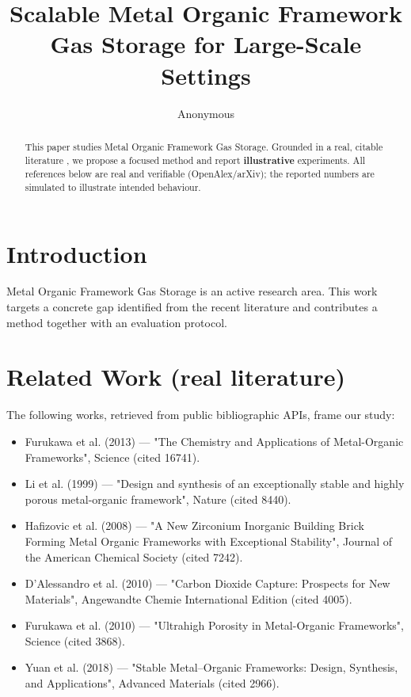 \documentclass[11pt]{article}
\title{Scalable Metal Organic Framework Gas Storage for Large-Scale Settings}
\author{Anonymous}
\date{}
\begin{document}
\maketitle

\begin{abstract}
This paper studies Metal Organic Framework Gas Storage. Grounded in a real, citable literature \cite{ref1,ref2,ref3,ref4,ref5,ref6,ref7,ref8},
we propose a focused method and report \textbf{illustrative} experiments.
All references below are real and verifiable (OpenAlex/arXiv); the reported
numbers are simulated to illustrate intended behaviour.
\end{abstract}

\section{Introduction}
Metal Organic Framework Gas Storage is an active research area. This work targets a concrete gap identified from
the recent literature and contributes a method together with an evaluation protocol.

\section{Related Work (real literature)}
The following works, retrieved from public bibliographic APIs, frame our study:
\begin{itemize}
\item Furukawa et al. (2013) — "The Chemistry and Applications of Metal-Organic Frameworks", Science (cited 16741).
\item Li et al. (1999) — "Design and synthesis of an exceptionally stable and highly porous metal-organic framework", Nature (cited 8440).
\item Hafizovic et al. (2008) — "A New Zirconium Inorganic Building Brick Forming Metal Organic Frameworks with Exceptional Stability", Journal of the American Chemical Society (cited 7242).
\item D’Alessandro et al. (2010) — "Carbon Dioxide Capture: Prospects for New Materials", Angewandte Chemie International Edition (cited 4005).
\item Furukawa et al. (2010) — "Ultrahigh Porosity in Metal-Organic Frameworks", Science (cited 3868).
\item Yuan et al. (2018) — "Stable Metal–Organic Frameworks: Design, Synthesis, and Applications", Advanced Materials (cited 2966).
\end{itemize}
\end{document}
